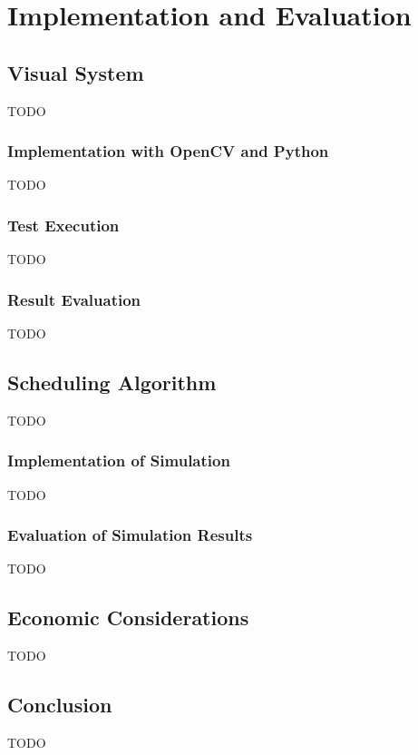 \chapter{Implementation and Evaluation}
\label{chap:impl}


\section{Visual System}
TODO
\subsection{Implementation with OpenCV and Python}
TODO
\subsection{Test Execution}
TODO
\subsection{Result Evaluation}
TODO

\section{Scheduling Algorithm}
TODO
\subsection{Implementation of Simulation}
TODO
\subsection{Evaluation of Simulation Results}
TODO

\section{Economic Considerations}
TODO
\section{Conclusion}
TODO